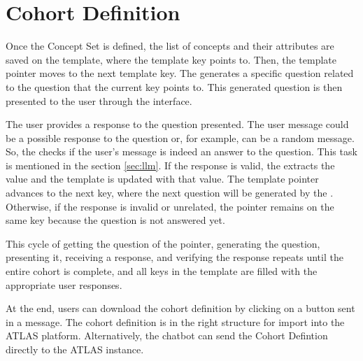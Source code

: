 \section{Cohort Definition}




Once the Concept Set is defined, the list of concepts and their attributes are saved on the template, where the template key points to. Then, the template pointer moves to the next template key. The {\llm} generates a specific question related to the question that the current key points to. This generated question is then presented to the user through the interface.

The user provides a response to the question presented. The user message could be a possible response to the question or, for example, can be a random message. So, the {\llm} checks if the user's message is indeed an answer to the question. This task is mentioned in the section \ref{sec:llm}. If the response is valid, the {\llm} extracts the value and the template is updated with that value. The template pointer advances to the next key, where the next question will be generated by the {\llm}. Otherwise, if the response is invalid or unrelated, the pointer remains on the same key because the question is not answered yet.

This cycle of getting the question of the pointer, generating the question, presenting it, receiving a response, and verifying the response repeats until the entire cohort is complete, and all keys in the template are filled with the appropriate user responses.

At the end, users can download the cohort definition by clicking on a button sent in a message. The cohort definition is in the right structure for import into the ATLAS platform. Alternatively, the chatbot can send the Cohort Defintion directly to the ATLAS instance.


